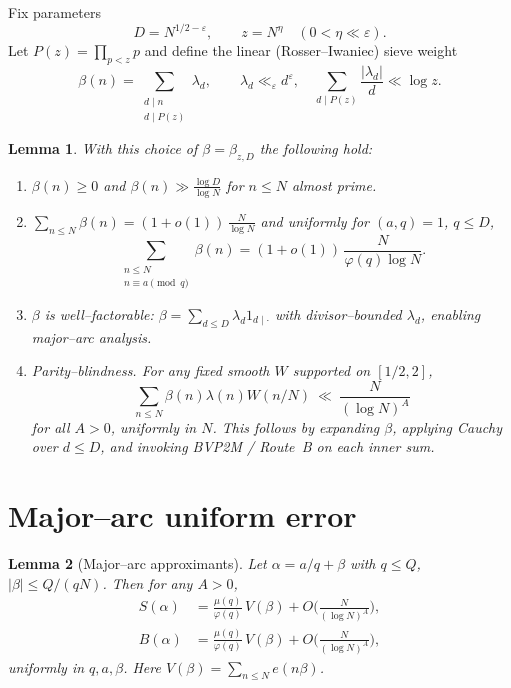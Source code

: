 \documentclass[11pt]{article}
\newtheorem{lemma}{Lemma}[part]
\theoremstyle{definition}
\theoremstyle{remark}
\numberwithin{equation}{part}
\begin{document}
Fix parameters
\[
	D=N^{1/2-\varepsilon},\qquad z=N^{\eta}\quad(0<\eta\ll \varepsilon).
\]
Let $P(z)=\prod_{p<z}p$ and define the linear (Rosser--Iwaniec) sieve weight
\[
	\beta(n)=\sum_{\substack{d\mid n\\ d\mid P(z)}} \lambda_d,\qquad
	\lambda_d\ll_\varepsilon d^{\varepsilon},\quad
	\sum_{d\mid P(z)}\frac{|\lambda_d|}{d}\ll \log z.
\]

\begin{lemma}\label{lem:beta-properties}
	With this choice of $\beta=\beta_{z,D}$ the following hold:
	\begin{enumerate}[label=(B\arabic*)]
		\item $\beta(n)\ge 0$ and $\beta(n)\gg \frac{\log D}{\log N}$ for $n\le N$ almost prime.
		\item $\sum_{n\le N}\beta(n)=(1+o(1))\,\tfrac{N}{\log N}$ and uniformly for $(a,q)=1$, $q\le D$,
		      \[
			      \sum_{\substack{n\le N\\ n\equiv a\pmod q}}\beta(n)
			      =(1+o(1))\,\frac{N}{\varphi(q)\log N}.
		      \]
		\item $\beta$ is well--factorable: $\beta=\sum_{d\le D}\lambda_d 1_{d\mid\cdot}$ with divisor--bounded $\lambda_d$, enabling major--arc analysis.
		\item \emph{Parity--blindness.} For any fixed smooth $W$ supported on $[1/2,2]$,
		      \[
			      \sum_{n\le N}\beta(n)\lambda(n)W(n/N)
			      \ \ll\ \frac{N}{(\log N)^A}
		      \]
		      for all $A>0$, uniformly in $N$. This follows by expanding $\beta$, applying Cauchy over $d\le D$, and invoking BVP2M / Route~B on each inner sum.
	\end{enumerate}
\end{lemma}

\section{Major--arc uniform error}

\begin{lemma}[Major--arc approximants]\label{lem:major-errors}
	Let $\alpha=a/q+\beta$ with $q\le Q$, $|\beta|\le Q/(qN)$. Then for any $A>0$,
	\begin{align*}
		S(\alpha) & =\frac{\mu(q)}{\varphi(q)}\,V(\beta)+O\!\Big(\frac{N}{(\log N)^A}\Big), \\
		B(\alpha) & =\frac{\mu(q)}{\varphi(q)}\,V(\beta)+O\!\Big(\frac{N}{(\log N)^A}\Big),
	\end{align*}
	uniformly in $q,a,\beta$. Here $V(\beta)=\sum_{n\le N}e(n\beta)$.
\end{lemma}
\end{document}
